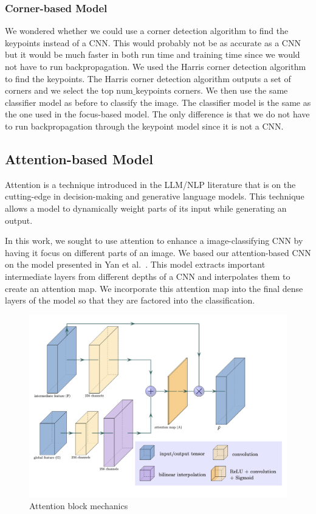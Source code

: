 \subsubsection{Corner-based Model}
We wondered whether we could use a corner detection algorithm to find the keypoints instead of a CNN. This would probably not be as accurate as a CNN but it would be much faster in both run time and training time since we would not have to run backpropagation. We used the Harris corner detection algorithm to find the keypoints. The Harris corner detection algorithm outputs a set of corners and we select the top \(\text{num\_keypoints}\) corners. We then use the same classifier model as before to classify the image. The classifier model is the same as the one used in the focus-based model. The only difference is that we do not have to run backpropagation through the keypoint model since it is not a CNN. 

\subsection{Attention-based Model}
Attention is a technique introduced in the LLM/NLP literature that is on the cutting-edge in decision-making and generative language models. This technique allows a model to dynamically weight parts of its input while generating an output.

In this work, we sought to use attention to enhance a image-classifying CNN by having it focus on different parts of an image. We based our attention-based CNN on the model presented in Yan et al.~\cite{10.1007/978-3-030-20351-1_62}. This model extracts important intermediate layers from different depths of a CNN and interpolates them to create an attention map. We incorporate this attention map into the final dense layers of the model so that they are factored into the classification.
\begin{figure}[hbt!]
    \centering
    \includegraphics[width=\linewidth]{images/attentionhead.png}
    \caption{Attention block mechanics}
    \label{fig:result1}
\end{figure}

